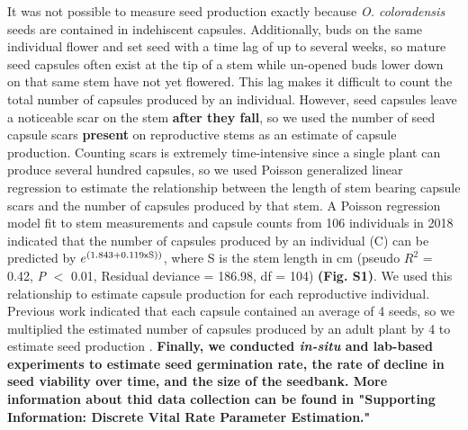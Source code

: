 \documentclass[12pt, letterpaper]{article}
\begin{document}
It was not possible to measure seed production exactly because \textit{O. coloradensis} seeds are contained in indehiscent capsules. Additionally, buds on the same individual flower and set seed with a time lag of up to several weeks, so mature seed capsules often exist at the tip of a stem while un-opened buds lower down on that same stem have not yet flowered. This lag makes it difficult to count the total number of capsules produced by an individual. However, seed capsules leave a noticeable scar on the stem \textbf{after they fall}, so we used the number of seed capsule scars \textbf{present} on reproductive stems as an estimate of capsule production. Counting scars is extremely time-intensive since a single plant can produce several hundred capsules, so we used Poisson generalized linear regression to estimate the relationship between the length of stem bearing capsule scars and the number of capsules produced by that stem. A Poisson regression model fit to stem measurements and capsule counts from 106 individuals in 2018 indicated that the number of capsules produced by an individual (C) can be predicted by $e^{(1.843 + 0.119\text{\textsf{x}}\text{S}))}$, where S is the stem length in cm (pseudo $R^2$ = 0.42, \textit{P} $<$ 0.01, Residual deviance = 186.98, df = 104) \textbf{(Fig. S1)}. We used this relationship to estimate capsule production for each reproductive individual. Previous work indicated that each capsule contained an average of 4 seeds, so we multiplied the estimated number of capsules produced by an adult plant by 4 to estimate seed production \cite{Burgess2005CapsuleColoradensis}. \textbf{Finally, we conducted \textit{in-situ} and lab-based experiments to estimate seed germination rate, the rate of decline in seed viability over time, and the size of the seedbank. More information about thid data collection can be found in "Supporting Information: Discrete Vital Rate Parameter Estimation." }
\end{document}
